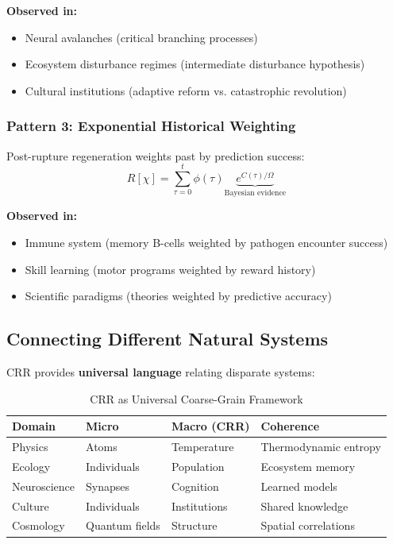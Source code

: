 \documentclass[11pt,a4paper]{article}
\theoremstyle{definition}
\theoremstyle{remark}
\begin{document}
\textbf{Observed in:}
\begin{itemize}
\item Neural avalanches (critical branching processes)
\item Ecosystem disturbance regimes (intermediate disturbance hypothesis)
\item Cultural institutions (adaptive reform vs. catastrophic revolution)
\end{itemize}

\subsubsection{Pattern 3: Exponential Historical Weighting}

Post-rupture regeneration weights past by prediction success:
\begin{equation}
R[\chi] = \sum_{\tau=0}^t \phi(\tau) \underbrace{e^{C(\tau)/\Omega}}_{\text{Bayesian evidence}}
\end{equation}

\textbf{Observed in:}
\begin{itemize}
\item Immune system (memory B-cells weighted by pathogen encounter success)
\item Skill learning (motor programs weighted by reward history)
\item Scientific paradigms (theories weighted by predictive accuracy)
\end{itemize}

\subsection{Connecting Different Natural Systems}

CRR provides \textbf{universal language} relating disparate systems:

\begin{table}[H]
\centering
\caption{CRR as Universal Coarse-Grain Framework}
\begin{tabular}{@{}lp{4cm}p{4cm}p{4cm}@{}}
\toprule
\textbf{Domain} & \textbf{Micro} & \textbf{Macro (CRR)} & \textbf{Coherence} \\
\midrule
Physics & Atoms & Temperature & Thermodynamic entropy \\
Ecology & Individuals & Population & Ecosystem memory \\
Neuroscience & Synapses & Cognition & Learned models \\
Culture & Individuals & Institutions & Shared knowledge \\
Cosmology & Quantum fields & Structure & Spatial correlations \\
\bottomrule
\end{tabular}
\end{table}
\end{document}
